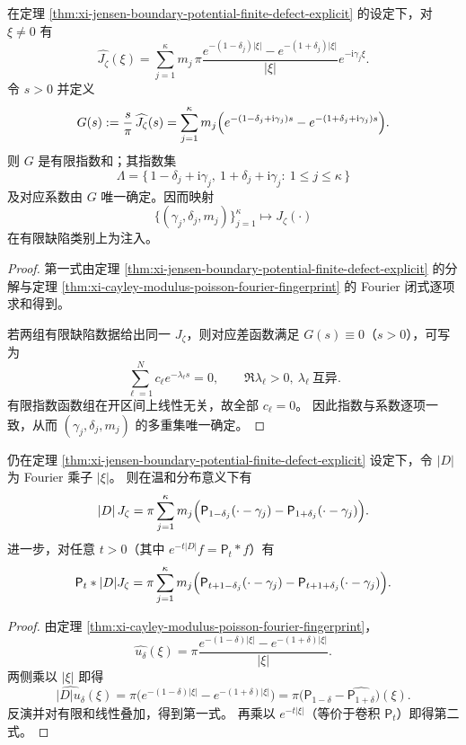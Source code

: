 \begin{theorem}\label{thm:xi-jensen-fourier-laplace-fingerprint-injectivity}
在定理 \ref{thm:xi-jensen-boundary-potential-finite-defect-explicit} 的设定下，对 \(\xi\neq 0\) 有
\[
\widehat{J_\zeta}(\xi)
=\sum_{j=1}^{\kappa}m_j\,
\pi\frac{e^{-(1-\delta_j)|\xi|}-e^{-(1+\delta_j)|\xi|}}{|\xi|}
e^{-\mathrm{i}\gamma_j\xi}.
\]
令 \(s>0\) 并定义
\[
G(s):=\frac{s}{\pi}\,\widehat{J_\zeta}(s)
=\sum_{j=1}^{\kappa}m_j
\Bigl(e^{-(1-\delta_j+\mathrm{i}\gamma_j)s}
-e^{-(1+\delta_j+\mathrm{i}\gamma_j)s}\Bigr).
\]
则 \(G\) 是有限指数和；其指数集
\[
\Lambda=\{\,1-\delta_j+\mathrm{i}\gamma_j,\ 1+\delta_j+\mathrm{i}\gamma_j:\ 1\le j\le\kappa\,\}
\]
及对应系数由 \(G\) 唯一确定。因而映射
\[
\{(\gamma_j,\delta_j,m_j)\}_{j=1}^{\kappa}\longmapsto J_\zeta(\cdot)
\]
在有限缺陷类别上为注入。
\end{theorem}
\begin{proof}
第一式由定理 \ref{thm:xi-jensen-boundary-potential-finite-defect-explicit} 的分解与定理
\ref{thm:xi-cayley-modulus-poisson-fourier-fingerprint} 的 Fourier 闭式逐项求和得到。

若两组有限缺陷数据给出同一 \(J_\zeta\)，则对应差函数满足 \(G(s)\equiv 0\)（\(s>0\)），可写为
\[
\sum_{\ell=1}^{N}c_\ell e^{-\lambda_\ell s}=0,\qquad
\Re\lambda_\ell>0,\ \lambda_\ell\ \text{互异}.
\]
有限指数函数组在开区间上线性无关，故全部 \(c_\ell=0\)。
因此指数与系数逐项一致，从而 \((\gamma_j,\delta_j,m_j)\) 的多重集唯一确定。
\end{proof}

\begin{proposition}\label{prop:xi-jensen-poisson-intertwiner-fractional-derivative}
仍在定理 \ref{thm:xi-jensen-boundary-potential-finite-defect-explicit} 设定下，令 \(|D|\) 为 Fourier 乘子 \(|\xi|\)。
则在温和分布意义下有
\[
|D|\,J_\zeta
=\pi\sum_{j=1}^{\kappa}m_j\Bigl(
\mathsf P_{1-\delta_j}(\cdot-\gamma_j)-\mathsf P_{1+\delta_j}(\cdot-\gamma_j)\Bigr).
\]
进一步，对任意 \(t>0\)（其中 \(e^{-t|D|}f=\mathsf P_t*f\)）有
\[
\mathsf P_t*|D|J_\zeta
=\pi\sum_{j=1}^{\kappa}m_j\Bigl(
\mathsf P_{t+1-\delta_j}(\cdot-\gamma_j)-\mathsf P_{t+1+\delta_j}(\cdot-\gamma_j)\Bigr).
\]
\end{proposition}
\begin{proof}
由定理 \ref{thm:xi-cayley-modulus-poisson-fourier-fingerprint}，
\[
\widehat{u_\delta}(\xi)=
\pi\frac{e^{-(1-\delta)|\xi|}-e^{-(1+\delta)|\xi|}}{|\xi|}.
\]
两侧乘以 \(|\xi|\) 即得
\[
\widehat{|D|u_\delta}(\xi)=\pi\bigl(e^{-(1-\delta)|\xi|}-e^{-(1+\delta)|\xi|}\bigr)
=\pi\bigl(\widehat{\mathsf P_{1-\delta}}-\widehat{\mathsf P_{1+\delta}}\bigr)(\xi).
\]
反演并对有限和线性叠加，得到第一式。
再乘以 \(e^{-t|\xi|}\)（等价于卷积 \(\mathsf P_t\)）即得第二式。
\end{proof}

